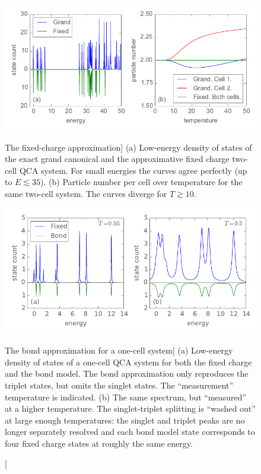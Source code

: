 \begin{figure}
  \center
  \includegraphics{fixed_charge_approximation}
  \caption
  [The fixed-charge approximation]
  {
  (a) Low-energy density of states of the exact grand canonical and the
  approximative fixed charge two-cell QCA system. For small energies the curves
  agree perfectly (up to $E \lesssim 35$). (b) Particle number per cell over
  temperature for the same two-cell system. The curves diverge for $T \gtrsim
  10$.
  }
  \label{fig:fixed_charge_approximation}
 
  \vspace*{0.75cm}

  \includegraphics{bond_approximation1}
  \caption
  [The bond approximation for a one-cell system]
  {
  (a) Low-energy density of states of a one-cell QCA system for both the fixed
  charge and the bond model. The bond approximation only reproduces the triplet
  states, but omits the singlet states. The ``measurement'' temperature is
  indicated. (b) The same spectrum, but ``measured'' at a higher temperature.
  The singlet-triplet splitting is ``washed out'' at large enough temperatures:
  the singlet and triplet peaks are no longer separately resolved and each bond
  model state corresponds to four fixed charge states at roughly the same
  energy.
  }
  \label{fig:bond_approximation1}
\end{figure}

